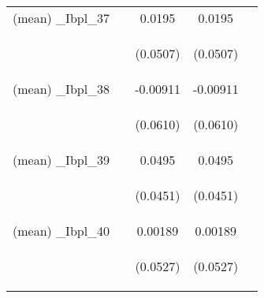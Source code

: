 \documentclass[]{article}
\begin{document}
\begin{center}
\begin{tabular}{lcccc}
(mean) \_Ibpl\_37 &  & 0.0195 & 0.0195 &  \\
\vspace{4pt} & \begin{footnotesize}\end{footnotesize} & \begin{footnotesize}(0.0507)\end{footnotesize} & \begin{footnotesize}(0.0507)\end{footnotesize} & \begin{footnotesize}\end{footnotesize} \\
(mean) \_Ibpl\_38 &  & -0.00911 & -0.00911 &  \\
\vspace{4pt} & \begin{footnotesize}\end{footnotesize} & \begin{footnotesize}(0.0610)\end{footnotesize} & \begin{footnotesize}(0.0610)\end{footnotesize} & \begin{footnotesize}\end{footnotesize} \\
(mean) \_Ibpl\_39 &  & 0.0495 & 0.0495 &  \\
\vspace{4pt} & \begin{footnotesize}\end{footnotesize} & \begin{footnotesize}(0.0451)\end{footnotesize} & \begin{footnotesize}(0.0451)\end{footnotesize} & \begin{footnotesize}\end{footnotesize} \\
(mean) \_Ibpl\_40 &  & 0.00189 & 0.00189 &  \\
\vspace{4pt} & \begin{footnotesize}\end{footnotesize} & \begin{footnotesize}(0.0527)\end{footnotesize} & \begin{footnotesize}(0.0527)\end{footnotesize} & \begin{footnotesize}\end{footnotesize} \\

\end{tabular}
\end{center}
\end{document}
